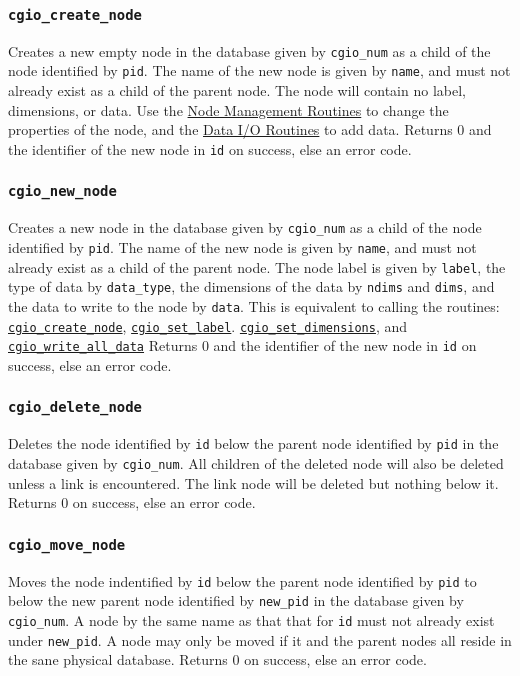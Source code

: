 \subsubsection{\texttt{cgio\_create\_node}} \label{create_node}
    \noindent
    Creates a new empty node in the database given by \texttt{cgio\_num}
    as a child of the node identified by \texttt{pid}. The name of the new
    node is given by \texttt{name}, and must not already exist as a child
    of the parent node. The node will contain no label, dimensions,
    or data. Use the \hyperlink{s:node}{Node Management Routines} to
    change the properties of the node, and the
    \hyperlink{s:dataio}{Data I/O Routines} to add data. Returns 0 and the
    identifier of the new node in \texttt{id} on success, else an error code.

\subsubsection{\texttt{cgio\_new\_node}} \label{new_node}
    \noindent
    Creates a new node in the database given by \texttt{cgio\_num}
    as a child of the node identified by \texttt{pid}. The name of the new
    node is given by \texttt{name}, and must not already exist as a child
    of the parent node. The node label is given by \texttt{label},
    the type of data by \texttt{data\_type}, the dimensions of the data by
    \texttt{ndims} and \texttt{dims}, and the data to write to the node
    by \texttt{data}. This is equivalent to calling the routines:
    \hyperlink{create_node}{\texttt{cgio\_create\_node}},
    \hyperlink{set_label}{\texttt{cgio\_set\_label}}.
    \hyperlink{set_dimensions}{\texttt{cgio\_set\_dimensions}}, and
    \hyperlink{write_all_data}{\texttt{cgio\_write\_all\_data}}
    Returns 0 and the identifier of the new node in \texttt{id} on success,
    else an error code.

\subsubsection{\texttt{cgio\_delete\_node}} \label{delete_node}
    \noindent
    Deletes the node identified by \texttt{id} below the parent node identified
    by \texttt{pid} in the database given by \texttt{cgio\_num}. All children
    of the deleted node will also be deleted unless a link is encountered.
    The link node will be deleted but nothing below it.
    Returns 0 on success, else an error code.

\subsubsection{\texttt{cgio\_move\_node}} \label{move_node}
    \noindent
    Moves the node indentified by \texttt{id} below the parent node identified
    by \texttt{pid} to below the new parent node identified by \texttt{new\_pid}
    in the database given by \texttt{cgio\_num}. A node by the same name as
    that that for \texttt{id} must not already exist under \texttt{new\_pid}.
    A node may only be moved if it and the parent nodes all reside in the
    sane physical database. Returns 0 on success, else an error code.

